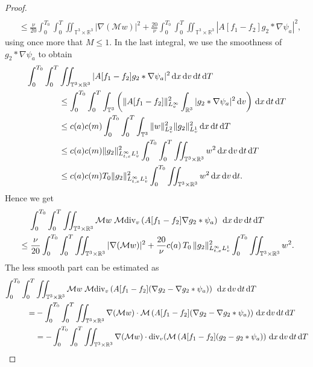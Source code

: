 \documentclass[11pt,american, reqno]{amsart}
\numberwithin{equation}{section}
\newcommand{\R}{\mathbb R}
\newcommand{\1}{\mathds{1}}
\newcommand{\dt}{\, {\rm d} t}
\newcommand{\dT}{\, {\rm d} T}
\newcommand{\dv}{\, {\rm d} v}
\newcommand{\dx}{\, {\rm d} x}
\newcommand{\T}{\mathbb{T}}
\numberwithin{equation}{section}
\begin{document}
\begin{proof}
\begin{align*}
\\
&\leq 
\frac{\nu}{20}\int_0^{T_0} \int_0^{T} \iint_{\T^3 \times \R^3}  |\nabla(\mathcal{M} w)|^2 %
+  \frac{20}{\nu} \int_0^{T_0} \int_0^{T} \iint_{\T^3 \times \R^3}  
|  A[f_1-f_2] g_2 \ast \nabla \psi_a|^2,
\end{align*}
using once more that $M\le 1$. In the last integral, we use the smoothness of $g_2 \ast \nabla \psi_a$ to obtain 
\begin{align*}
   \int_0^{T_0} \int_0^{T}& \iint_{\T^3 \times \R^3}  |  A[f_1-f_2] g_2 \ast \nabla \psi_a|^2 \dx\dv \dt\dT
\\
& \leq   \int_0^{T_0} \int_0^{T} \int_{\T^3} \left(\| A[f_1-f_2] \|^2_{L^\infty_v} \int_{\R^3}  |g_2 \ast \nabla \psi_a|^2 \dv\right) \dx\dt\dT
\\
& \leq  
c(a) c(m) \int_0^{T_0} \int_0^{T} \int_{\T^3} \| w \|^2_{L^2_v} \|g_2\|^2_{L^1_v} \dx\dt\dT
\\
& \le  
c(a) c(m) \|g_2\|^2_{L^\infty_{t,x}L^1_v}  \int_0^{T_0} \int_0^{T} \iint_{\T^3 \times \R^3} w^2 \dx\dv\dt\dT
\\
& \le  
c(a) c(m)  T_0 \|g_2\|^2_{L^\infty_{t,x}L^1_v}  \int_0^{T_0} \iint_{\T^3 \times \R^3} w^2 \dx\dv\dt. 
\end{align*}
Hence we get 
\begin{align*}
& \quad \,
    \int_0^{T_0} \int_0^{T} \iint_{\T^3 \times \R^3}   \mathcal{M} w \; \mathcal{M} \textrm{div}_v \left( A[f_1-f_2] \nabla g_2 \ast \psi_a \right) \; \dx\dv\dt\dT 
\\
&\leq  
\frac{\nu}{20}\int_0^{T_0} \int_0^{T} \iint_{\T^3 \times \R^3}  
|\nabla(\mathcal{M} w)|^2 %
+  \frac{20}{\nu}  c(a) \, T_0 \, \|g_2\|^2_{L^\infty_{t,x}L^1_v}  \int_0^{T_0}  \iint_{\T^3 \times \R^3} w^2. %
\end{align*}
The less smooth part can be estimated as 
\begin{align*}
   \int_0^{T_0} \int_0^{T}& \iint_{\T^3 \times \R^3}    \mathcal{M} w \; \mathcal{M} \textrm{div}_v \left( A[f_1-f_2](\nabla g_2 - \nabla g_2 \ast \psi_a )\right) \; \dx\dv\dt\dT  
\\
   =& - \int_0^{T_0} \int_0^{T} \iint_{\T^3 \times \R^3}  \nabla(\mathcal{M} w) \cdot  \mathcal{M} \left( A[f_1-f_2] (\nabla g_2 - \nabla g_2 \ast \psi_a) \right) \dx\dv\dt\dT 
\\
&= - \int_0^{T_0} \int_0^{T} \iint_{\T^3 \times \R^3}  \nabla(\mathcal{M} w) \cdot  \textrm{div}_v ( \mathcal{M} \left( A[f_1-f_2] ( g_2 -g_2 \ast \psi_a) \right) \dx\dv\dt\dT 

\end{align*}
\end{proof}
\end{document}
